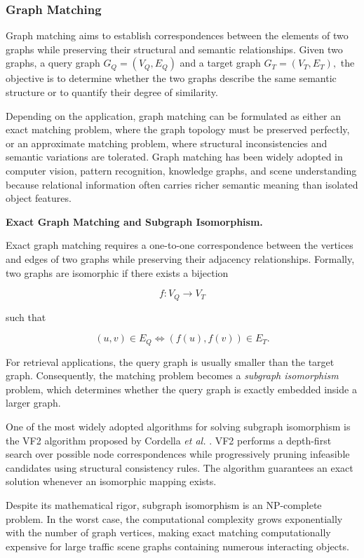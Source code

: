\documentclass[a4paper, 11pt]{article} %
\begin{document}
\subsubsection{Graph Matching}

Graph matching aims to establish correspondences between the elements of two graphs while preserving their structural and semantic relationships. Given two graphs, a query graph
\(
G_Q=(V_Q,E_Q)
\)
and a target graph
\(
G_T=(V_T,E_T),
\)
the objective is to determine whether the two graphs describe the same semantic structure or to quantify their degree of similarity.

Depending on the application, graph matching can be formulated as either an exact matching problem, where the graph topology must be preserved perfectly, or an approximate matching problem, where structural inconsistencies and semantic variations are tolerated. Graph matching has been widely adopted in computer vision, pattern recognition, knowledge graphs, and scene understanding because relational information often carries richer semantic meaning than isolated object features.

\textbf{Exact Graph Matching and Subgraph Isomorphism.}

Exact graph matching requires a one-to-one correspondence between the vertices and edges of two graphs while preserving their adjacency relationships. Formally, two graphs are isomorphic if there exists a bijection

\[
f:V_Q \rightarrow V_T
\]

such that

\[
(u,v)\in E_Q
\iff
(f(u),f(v))\in E_T.
\]

For retrieval applications, the query graph is usually smaller than the target graph. Consequently, the matching problem becomes a \emph{subgraph isomorphism} problem, which determines whether the query graph is exactly embedded inside a larger graph.

One of the most widely adopted algorithms for solving subgraph isomorphism is the VF2 algorithm proposed by Cordella \textit{et al.} \cite{cordella2004sub}. VF2 performs a depth-first search over possible node correspondences while progressively pruning infeasible candidates using structural consistency rules. The algorithm guarantees an exact solution whenever an isomorphic mapping exists.

Despite its mathematical rigor, subgraph isomorphism is an NP-complete problem. In the worst case, the computational complexity grows exponentially with the number of graph vertices, making exact matching computationally expensive for large traffic scene graphs containing numerous interacting objects.
\end{document}
